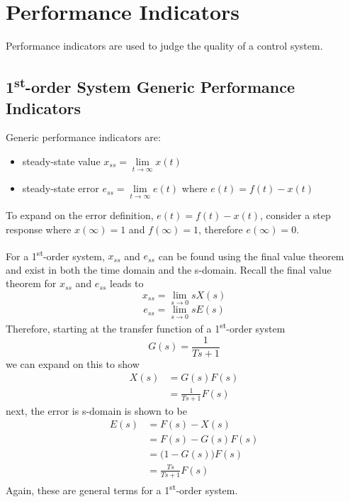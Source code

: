\documentclass[12pt,letter]{article}
\numberwithin{ex}{section} %
\numberwithin{re}{section} %
\numberwithin{equation}{section}	%
\begin{document}
%	
%	

	\setcounter{section}{4}	
	\setcounter{figure}{0}   
	\renewcommand\thefigure{\thesection.\arabic{figure}}


\section{Performance Indicators}

Performance indicators are used to judge the quality of a control system. 

\subsection{1\textsuperscript{st}-order System Generic Performance Indicators}


Generic performance indicators are:
\begin{itemize}
	\item steady-state value $x_{ss} = \lim\limits_{t \rightarrow \infty} x(t)$
	\item steady-state error $e_{ss} = \lim\limits_{t \rightarrow \infty} e(t)$ where  $e(t) = f(t) - x(t)$
\end{itemize}
To expand on the error definition, $e(t) = f(t) - x(t)$, consider a step response where $x(\infty) =1$ and $f(\infty) =1$, therefore $e(\infty)=0$. 

For a 1\textsuperscript{st}-order system, $x_{ss}$ and $e_{ss}$ can be found using the final value theorem and exist in both the time domain and the s-domain. Recall the final value theorem for  $x_{ss}$ and $e_{ss}$ leads to
\begin{equation}
x_{ss} = \lim\limits_{s \rightarrow 0} s X(s)
\end{equation}
\begin{equation}
e_{ss} = \lim\limits_{s \rightarrow 0} s E(s)
\end{equation}
Therefore, starting at the transfer function of a 1\textsuperscript{st}-order system
\begin{equation}
G(s) = \frac{1}{Ts+1}
\end{equation}
we can expand on this to show
\begin{align}
X(s) &= G(s)F(s) \\
&= \frac{1}{Ts +1}F(s) \nonumber
\end{align}
next, the error is s-domain is shown to be
\begin{align}
E(s) &= F(s) - X(s) \\
&= F(s) - G(s)F(s) \\ \nonumber
&= \big( 1-G(s) \big) F(s) \\ \nonumber
&= \frac{Ts}{Ts +1} F(s) \nonumber
\end{align}
Again, these are general terms for a 1\textsuperscript{st}-order system. 
\end{document}
